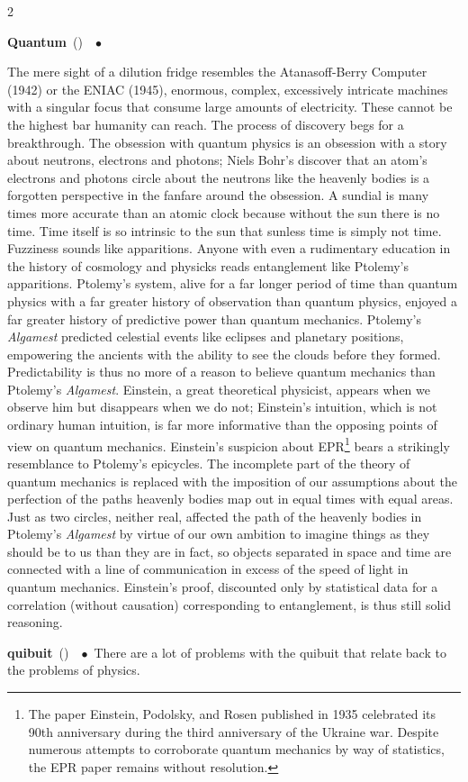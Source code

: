 \documentclass[10pt,a4paper,twoside]{article} %
\newcommand{\entry}[4]{\markboth{#1}{#1}\textbf{#1}\ {(#2)}\ \textit{#3}\ $\bullet$\ {#4}}  %
\begin{document}
\begin{multicols}{2}
\entry{Quantum} {} {} {

\newline \indent The mere sight of a dilution fridge resembles the Atanasoff-Berry Computer (1942) or the ENIAC (1945), enormous, complex, excessively intricate machines with a singular focus that consume large amounts of electricity. These cannot be the highest bar humanity can reach. The process of discovery begs for a breakthrough. \newline \indent The obsession with quantum physics is an obsession with a story about neutrons, electrons and photons; Niels Bohr's discover that an atom's electrons and photons circle about the neutrons like the heavenly bodies is a forgotten perspective in the fanfare around the obsession. A sundial is many times more accurate than an atomic clock because without the sun there is no time. Time itself is so intrinsic to the sun that sunless time is simply not time. \newline \indent Fuzziness sounds like apparitions. Anyone with even a rudimentary education in the history of cosmology and physicks reads entanglement like Ptolemy's apparitions. Ptolemy's system, alive for a far longer period of time than quantum physics with a far greater history of observation than quantum physics, enjoyed a far greater history of predictive power than quantum mechanics. Ptolemy's \emph{Algamest} predicted celestial events like eclipses and planetary positions, empowering the ancients with the ability to see the clouds before they formed. Predictability is thus no more of a reason to believe quantum mechanics than Ptolemy's \emph{Algamest}. \newline \indent Einstein, a great theoretical physicist, appears when we observe him but disappears when we do not; Einstein's intuition, which is not ordinary human intuition, is far more informative than the opposing points of view on quantum mechanics. Einstein's suspicion about EPR\footnote{The paper Einstein, Podolsky, and Rosen published in 1935 celebrated its 90th anniversary during the third anniversary of the Ukraine war. Despite numerous attempts to corroborate quantum mechanics by way of statistics, the EPR paper remains without resolution.} bears a strikingly resemblance to Ptolemy's epicycles. The incomplete part of the theory of quantum mechanics is replaced with the imposition of our assumptions about the perfection of the paths heavenly bodies map out in equal times with equal areas. Just as two circles, neither real, affected the path of the heavenly bodies in Ptolemy's \emph{Algamest} by virtue of our own ambition to imagine things as they should be to us than they are in fact, so objects separated in space and time are connected with a line of communication in excess of the speed of light in quantum mechanics. Einstein's proof, discounted only by statistical data for a correlation (without causation) corresponding to entanglement, is thus still solid reasoning. 
}


\entry{quibuit} {} {} {There are a lot of problems with the quibuit that relate back to the problems of physics. }


\end{multicols}
\end{document}
